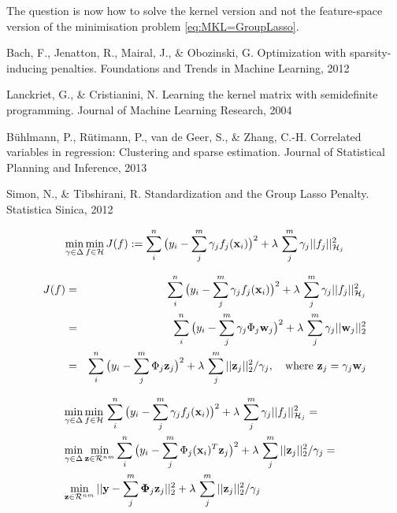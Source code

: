 The question is now how to solve the kernel version and not the feature-space version of the minimisation problem \eqref{eq:MKL=GroupLasso}.




\begin{thebibliography}{9}

Bach, F., Jenatton, R., Mairal, J., \& Obozinski, G. Optimization with sparsity-inducing penalties. Foundations and Trends in Machine Learning, 2012

Lanckriet, G., \& Cristianini, N. Learning the kernel matrix with semidefinite programming. Journal of Machine Learning Research, 2004 

Bühlmann, P., Rütimann, P., van de Geer, S., \& Zhang, C.-H. Correlated variables in regression: Clustering and sparse estimation. Journal of Statistical Planning and Inference, 2013

Simon, N., \& Tibshirani, R. Standardization and the Group Lasso Penalty. Statistica Sinica, 2012

\end{thebibliography}

\begin{equation}\label{eq:MKL_FJ}
 \min_{\gamma \in \Delta} \min_{f \in \mathcal{H}} J(f) := \sum_i^n \big( y_i - \sum_j^m \gamma_j f_j(\mathbf{x}_i) \big)^2 + \lambda \, \sum_j^m \gamma_j ||f_j||^2_{\mathcal{H}_j}
\end{equation}

\begin{eqnarray}
J(f) & = & \sum_i^n \big( y_i - \sum_j^m \gamma_j f_j(\mathbf{x}_i) \big)^2 + \lambda \, \sum_j^m \gamma_j ||f_j||^2_{\mathcal{H}_j} \\
& = & \sum_i^n \big( y_i - \sum_j^m \gamma_j \Phi_j \mathbf{w}_j \big)^2 + \lambda \, \sum_j^m \gamma_j ||\mathbf{w}_j||_2^2 \nonumber \\
& = & \sum_i^n \big( y_i - \sum_j^m \Phi_j \mathbf{z}_j \big)^2 + \lambda \, \sum_j^m ||\mathbf{z}_j||_2^2 / \gamma_j, \quad \text{where } \mathbf{z}_j = \gamma_j \mathbf{w}_j
\end{eqnarray}

\begin{eqnarray}
& \min_{\gamma \in \Delta} \min_{f \in \mathcal{H}} \, \sum_i^n \big( y_i - \sum_j^m \gamma_j f_j(\mathbf{x}_i) \big)^2 + \lambda \, \sum_j^m \gamma_j ||f_j||^2_{\mathcal{H}_j} = & \nonumber \\
& \min_{\gamma \in \Delta} \min_{\mathbf{z} \in \mathcal{R}^{nm}} \sum_i^n \big( y_i - \sum_j^m \Phi_j(\mathbf{x}_i)^T \mathbf{z}_j \big)^2 + \lambda \, \sum_j^m ||\mathbf{z}_j||_2^2 / \gamma_j  = & \nonumber \\
& \min_{\mathbf{z} \in \mathcal{R}^{nm}} || \mathbf{y} - \sum_j^m \mathbf{\Phi}_j \mathbf{z}_j ||_2^2 + \lambda \, \sum_j^m ||\mathbf{z}_j||_2^2 / \gamma_j &
\end{eqnarray}

